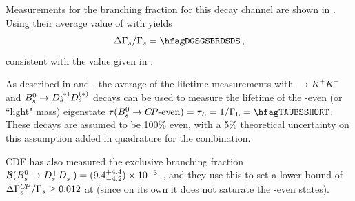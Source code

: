 {Measurements for the branching fraction for this
decay channel are shown in .
Using their average value of \hfagBRDSDS with  yields
\begin{equation}
\DGGs = \hfagDGSGSBRDSDS \,,
\end{equation}
consistent with the value given in . 

As described in 
and , the average of the lifetime
measurements with \Bs $\to K^+ K^-$ and
$B^0_s \to D_s^{(*)} D_s^{(*)}$ decays
can be used to measure the lifetime
of the \CP-even (or ``light" mass) eigenstate
$\tau(\Bs \to \CP\mbox{-even}) = \tau_L = 1/\Gamma_{\rm L} =
\hfagTAUBSSHORT$. These decays are assumed to be 100\% \CP even, with
a 5\% theoretical uncertainty on this assumption added in quadrature
for the combination.


CDF has also measured the exclusive branching fraction 
${\cal B}(B^0_s \to D^+_s D^-_s) = 
(9.4^{+4.4}_{-4.2}) \times 10^{-3}$~\cite{Abulencia:2007zz}, and
they use this to set a lower bound of
$\Delta\Gamma_{s}^{C\!P}/\Gamma_{s} \geq 0.012$ at  (since
on its own it does not saturate the \CP-even states).

} %

